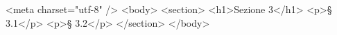 

    <meta charset="utf-8" />
  <body>
  <section>
    <h1>Sezione 3</h1>
    <p>§ 3.1</p>
    <p>§ 3.2</p>
  </section>
  </body>
